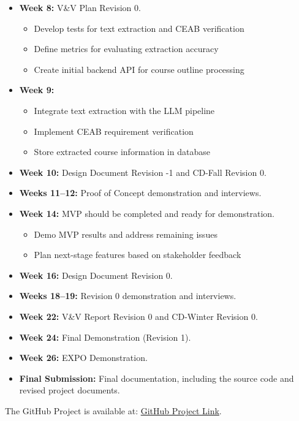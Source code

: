 \documentclass{article}
\begin{document}
\begin{itemize}
\item \textbf{Week 8:} V\&V Plan Revision 0.
  \begin{itemize}
    \item Develop tests for text extraction and CEAB verification
    \item Define metrics for evaluating extraction accuracy
    \item Create initial backend API for course outline processing
  \end{itemize}

\item \textbf{Week 9:}
  \begin{itemize}
    \item Integrate text extraction with the LLM pipeline
    \item Implement CEAB requirement verification
    \item Store extracted course information in database
  \end{itemize}

\item \textbf{Week 10:} Design Document Revision -1 and CD-Fall Revision 0.
\item \textbf{Weeks 11--12:} Proof of Concept demonstration and interviews.
\item \textbf{Week 14:} MVP should be completed and ready for demonstration.
\begin{itemize}
  \item Demo MVP results and address remaining issues
  \item Plan next-stage features based on stakeholder feedback
\end{itemize}

\item \textbf{Week 16:} Design Document Revision 0.
\item \textbf{Weeks 18--19:} Revision 0 demonstration and interviews.
\item \textbf{Week 22:} V\&V Report Revision 0 and CD-Winter Revision 0.
\item \textbf{Week 24:} Final Demonstration (Revision 1).
\item \textbf{Week 26:} EXPO Demonstration.
\item \textbf{Final Submission:} Final documentation, including the source code and revised project documents.
\end{itemize}

The GitHub Project is available at:
\href{https://github.com/shivyam/cas-course-optimization}{GitHub Project Link}.
\end{document}
